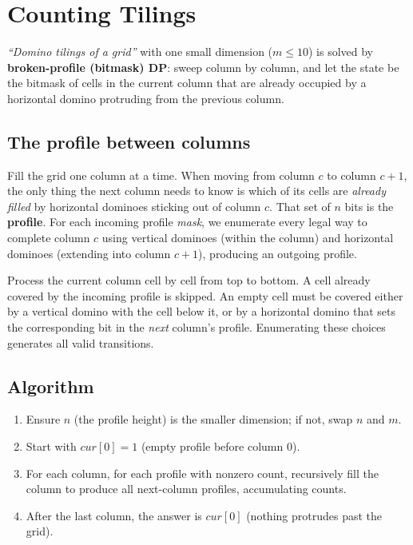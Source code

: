\section{Counting Tilings}
\label{sec:cses-counting-tilings}


\begin{patternbox}
\emph{``Domino tilings of a grid''} with one small dimension ($m\le10$) is
solved by \textbf{broken-profile (bitmask) DP}: sweep column by column,
and let the state be the bitmask of cells in the current column that are
already occupied by a horizontal domino protruding from the previous
column.
\end{patternbox}

\subsection*{The profile between columns}

Fill the grid one column at a time. When moving from column $c$ to column
$c+1$, the only thing the next column needs to know is which of its cells
are \emph{already filled} by horizontal dominoes sticking out of column
$c$. That set of $n$ bits is the \textbf{profile}. For each incoming
profile \textit{mask}, we enumerate every legal way to complete column $c$
using vertical dominoes (within the column) and horizontal dominoes
(extending into column $c+1$), producing an outgoing profile.

\begin{ideabox}
Process the current column cell by cell from top to bottom. A cell already
covered by the incoming profile is skipped. An empty cell must be covered
either by a vertical domino with the cell below it, or by a horizontal
domino that sets the corresponding bit in the \emph{next} column's
profile. Enumerating these choices generates all valid transitions.
\end{ideabox}

\subsection*{Algorithm}

\begin{enumerate}
  \item Ensure $n$ (the profile height) is the smaller dimension; if not,
        swap $n$ and $m$.
  \item Start with $\textit{cur}[0]=1$ (empty profile before column $0$).
  \item For each column, for each profile with nonzero count, recursively
        fill the column to produce all next-column profiles, accumulating
        counts.
  \item After the last column, the answer is $\textit{cur}[0]$ (nothing
        protrudes past the grid).
\end{enumerate}

